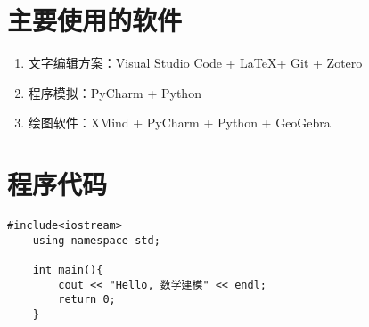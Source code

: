 


\nocite{*}


\appendix
\section{主要使用的软件}

\begin{enumerate}
    \item 文字编辑方案：Visual Studio Code + \LaTeX + Git + Zotero
    \item 程序模拟：PyCharm + Python
    \item 绘图软件：XMind + PyCharm + Python + GeoGebra
\end{enumerate}

\section{程序代码}

\begin{lstlisting}[caption={类的定义语句}]
    #include<iostream>
    using namespace std;

    int main(){
        cout << "Hello, 数学建模" << endl;
        return 0;
    }
\end{lstlisting}